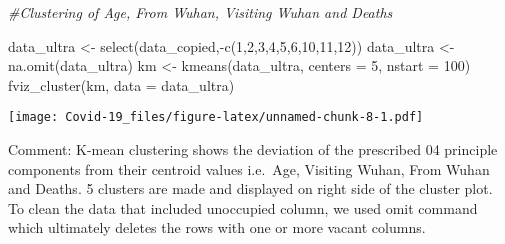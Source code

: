 \documentclass[
]{article}
\newenvironment{Shaded}{\begin{snugshade}}{\end{snugshade}}
\newcommand{\AttributeTok}[1]{\textcolor[rgb]{0.77,0.63,0.00}{#1}}
\newcommand{\CommentTok}[1]{\textcolor[rgb]{0.56,0.35,0.01}{\textit{#1}}}
\newcommand{\DecValTok}[1]{\textcolor[rgb]{0.00,0.00,0.81}{#1}}
\newcommand{\FunctionTok}[1]{\textcolor[rgb]{0.00,0.00,0.00}{#1}}
\newcommand{\NormalTok}[1]{#1}
\newcommand{\OtherTok}[1]{\textcolor[rgb]{0.56,0.35,0.01}{#1}}
\newcommand{\SpecialCharTok}[1]{\textcolor[rgb]{0.00,0.00,0.00}{#1}}
\begin{document}
\begin{Shaded}
\begin{Highlighting}[]
\CommentTok{\#Clustering of Age, From Wuhan, Visiting Wuhan and Deaths}

\NormalTok{data\_ultra }\OtherTok{\textless{}{-}} \FunctionTok{select}\NormalTok{(data\_copied,}\SpecialCharTok{{-}}\FunctionTok{c}\NormalTok{(}\DecValTok{1}\NormalTok{,}\DecValTok{2}\NormalTok{,}\DecValTok{3}\NormalTok{,}\DecValTok{4}\NormalTok{,}\DecValTok{5}\NormalTok{,}\DecValTok{6}\NormalTok{,}\DecValTok{10}\NormalTok{,}\DecValTok{11}\NormalTok{,}\DecValTok{12}\NormalTok{))}
\NormalTok{data\_ultra }\OtherTok{\textless{}{-}} \FunctionTok{na.omit}\NormalTok{(data\_ultra)}
\NormalTok{km }\OtherTok{\textless{}{-}} \FunctionTok{kmeans}\NormalTok{(data\_ultra, }\AttributeTok{centers =} \DecValTok{5}\NormalTok{, }\AttributeTok{nstart =} \DecValTok{100}\NormalTok{)}
\FunctionTok{fviz\_cluster}\NormalTok{(km, }\AttributeTok{data =}\NormalTok{ data\_ultra)}
\end{Highlighting}
\end{Shaded}

\texttt{[image: Covid-19\_files/figure-latex/unnamed-chunk-8-1.pdf]}

Comment: K-mean clustering shows the deviation of the prescribed 04
principle components from their centroid values i.e.~Age, Visiting
Wuhan, From Wuhan and Deaths. 5 clusters are made and displayed on right
side of the cluster plot. To clean the data that included unoccupied
column, we used omit command which ultimately deletes the rows with one
or more vacant columns.
\end{document}
